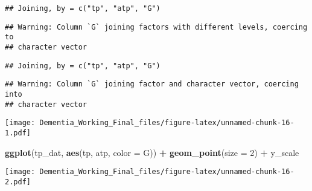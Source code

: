 \documentclass[]{article}
\newenvironment{Shaded}{\begin{snugshade}}{\end{snugshade}}
\newcommand{\DataTypeTok}[1]{\textcolor[rgb]{0.13,0.29,0.53}{#1}}
\newcommand{\DecValTok}[1]{\textcolor[rgb]{0.00,0.00,0.81}{#1}}
\newcommand{\KeywordTok}[1]{\textcolor[rgb]{0.13,0.29,0.53}{\textbf{#1}}}
\newcommand{\NormalTok}[1]{#1}
\newcommand{\OperatorTok}[1]{\textcolor[rgb]{0.81,0.36,0.00}{\textbf{#1}}}
\newcommand{\StringTok}[1]{\textcolor[rgb]{0.31,0.60,0.02}{#1}}
\begin{document}
\begin{verbatim}
## Joining, by = c("tp", "atp", "G")
\end{verbatim}

\begin{verbatim}
## Warning: Column `G` joining factors with different levels, coercing to
## character vector
\end{verbatim}

\begin{verbatim}
## Joining, by = c("tp", "atp", "G")
\end{verbatim}

\begin{verbatim}
## Warning: Column `G` joining factor and character vector, coercing into
## character vector
\end{verbatim}

\begin{Shaded}
\end{Shaded}

\texttt{[image: Dementia\_Working\_Final\_files/figure-latex/unnamed-chunk-16-1.pdf]}

\begin{Shaded}
\begin{Highlighting}[]
\KeywordTok{ggplot}\NormalTok{(tp_dat, }\KeywordTok{aes}\NormalTok{(tp, atp, }\DataTypeTok{color =}\NormalTok{ G)) }\OperatorTok{+}\StringTok{ }\KeywordTok{geom_point}\NormalTok{(}\DataTypeTok{size =} \DecValTok{2}\NormalTok{) }\OperatorTok{+}\StringTok{ }\NormalTok{y_scale}
\end{Highlighting}
\end{Shaded}

\texttt{[image: Dementia\_Working\_Final\_files/figure-latex/unnamed-chunk-16-2.pdf]}

\begin{Shaded}
\end{Shaded}
\end{document}
